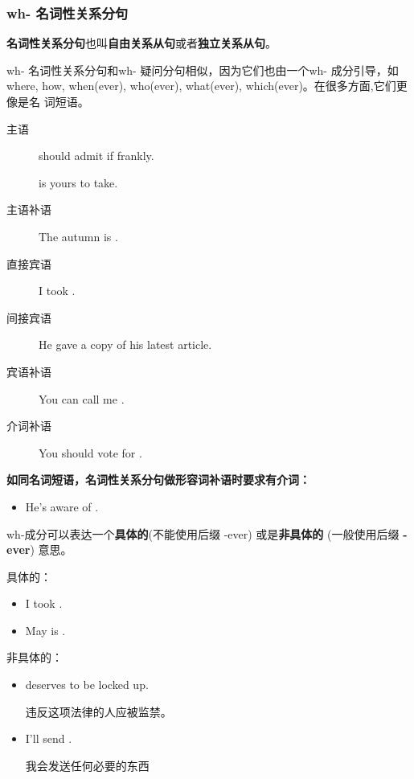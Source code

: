 \subsubsection{wh- 名词性关系分句}
\label{subsubsec:whnoun}

\textbf{名词性关系分句}也叫\textbf{自由关系从句}或者\textbf{独立关系从句}。

wh- 名词性关系分句和wh- 疑问分句相似，因为它们也由一个wh- 成分引导，如where,
how, when(ever), who(ever), what(ever), which(ever)。在很多方面,它们更像是名
词短语。
\begin{description}
\item[主语]  should admit if frankly.

   is yours to take.
\item[主语补语] The autumn is .
\item[直接宾语] I took .
\item[间接宾语] He gave  a copy of his latest article.
\item[宾语补语] You can call me .
\item[介词补语] You should vote for .
\end{description}

\textbf{如同名词短语，名词性关系分句做形容词补语时要求有介词：}
\begin{itemize}
\item He's aware of .
\end{itemize}

wh-成分可以表达一个\textbf{具体的}(不能使用后缀 -ever) 或是\textbf{非具体的}
(一般使用后缀 \textbf{-ever}) 意思。

具体的：
\begin{itemize}
\item I took .
\item May is .
\end{itemize}


非具体的：
\begin{itemize}
\item {} deserves to be locked up.

  违反这项法律的人应被监禁。
\item I'll send .

  我会发送任何必要的东西
\end{itemize}

